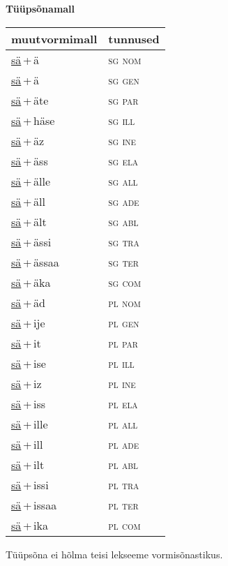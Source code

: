 
\vspace{1.8em}
\begin{minipage}{\textwidth}
\textbf{Tüüpsõnamall \,}\\

\begin{sideways}
\begin{tabular}{l l}
muutvormimall & tunnused \\
\hline
\underline{sä}\,+\,ä & \textsc{ sg nom } \\
\underline{sä}\,+\,ä & \textsc{ sg gen } \\
\underline{sä}\,+\,äte & \textsc{ sg par } \\
\underline{sä}\,+\,häse & \textsc{ sg ill } \\
\underline{sä}\,+\,äz & \textsc{ sg ine } \\
\underline{sä}\,+\,äss & \textsc{ sg ela } \\
\underline{sä}\,+\,älle & \textsc{ sg all } \\
\underline{sä}\,+\,äll & \textsc{ sg ade } \\
\underline{sä}\,+\,ält & \textsc{ sg abl } \\
\underline{sä}\,+\,ässi & \textsc{ sg tra } \\
\underline{sä}\,+\,ässaa & \textsc{ sg ter } \\
\underline{sä}\,+\,äka & \textsc{ sg com } \\
\underline{sä}\,+\,äd & \textsc{ pl nom } \\
\underline{sä}\,+\,ije & \textsc{ pl gen } \\
\underline{sä}\,+\,it & \textsc{ pl par } \\
\underline{sä}\,+\,ise & \textsc{ pl ill } \\
\underline{sä}\,+\,iz & \textsc{ pl ine } \\
\underline{sä}\,+\,iss & \textsc{ pl ela } \\
\underline{sä}\,+\,ille & \textsc{ pl all } \\
\underline{sä}\,+\,ill & \textsc{ pl ade } \\
\underline{sä}\,+\,ilt & \textsc{ pl abl } \\
\underline{sä}\,+\,issi & \textsc{ pl tra } \\
\underline{sä}\,+\,issaa & \textsc{ pl ter } \\
\underline{sä}\,+\,ika & \textsc{ pl com } \\
\end{tabular}
\end{sideways}
\label{tab:tüüpsõnamall-sää}

\end{minipage}

 
\vspace{1em}
\noindent Tüüpsõna ei hõlma teisi lekseeme vormi\-sõnastikus.
